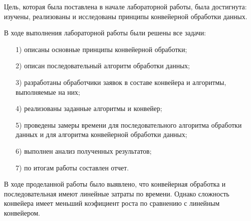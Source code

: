 Цель, которая была поставлена в начале лабораторной работы, была достигнута: изучены, реализованы и исследованы принципы конвейерной обработки данных.

В ходе выполнения лабораторной работы были решены все задачи:
\begin{enumerate}
	\item[1)] описаны основные принципы конвейерной обработки;
\item[2)] описан последовательный алгоритм обработки данных;
\item[3)]
разработаны обработчики заявок в составе конвейера и алгоритмы, выполняемые на них;
\item[4)] реализованы заданные алгоритмы и конвейер;
\item[5)] проведены замеры времени для последовательного алгоритма обработки данных и для алгоритма конвейерной обработки данных;%
\item[6)] выполнен анализ полученных результатов;
\item[7)] по итогам работы составлен отчет.
\end{enumerate}


В ходе проделанной работы было выявлено, что конвейерная обработка и последовательная имеют линейные затраты по времени. Однако сложность конвейера имеет меньший коэфициент роста по сравнению с линейным конвейером.